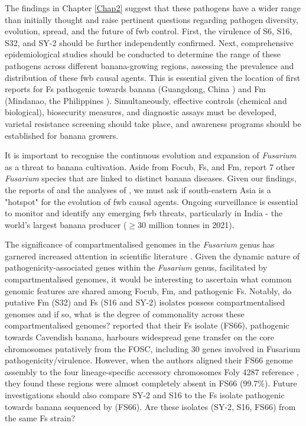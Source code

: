The findings in Chapter \ref{Chap2} suggest that these pathogens have a wider range than initially thought and raise pertinent questions regarding pathogen diversity, evolution, spread, and the future of \ac{fwb} control. First, the virulence of S6, S16, S32, and SY-2 should be further independently confirmed. Next, comprehensive epidemiological studies should be conducted to determine the range of these pathogens across different banana-growing regions, assessing the prevalence and distribution of these \ac{fwb} causal agents. This is essential given the location of first reports for \ac{Fs} pathogenic towards banana (Guangdong, China \parencite{Cui2021}) and \ac{Fm} (Mindanao, the Philippines \parencite{Nozawa2023}). Simultaneously, effective controls (chemical and biological), biosecurity measures, and diagnostic assays must be developed, varietal resistance screening should take place, and awareness programs should be established for banana growers. 

It is important to recognise the continuous evolution and expansion of \textit{Fusarium} as a threat to banana cultivation. Aside from \ac{Focub}, \ac{Fs}, and \ac{Fm}, \textcite{Jones1997, Du2017} report 7 other \textit{Fusarium} species that are linked to distinct banana diseases. Given our findings, the reports of \textcite{Cui2021, Nozawa2023} and the analyses of \textcite{Maryani2019}, we must ask if south-eastern Asia is a "hotspot" for the evolution of \ac{fwb} causal agents. Ongoing surveillance is essential to monitor and identify any emerging \ac{fwb} threats, particularly in India - the world's largest banana producer ($\ge30$ million tonnes in 2021).

The significance of compartmentalised genomes in the \textit{Fusarium} genus has garnered increased attention in scientific literature \parencite{Ma2010, Ma2013, Sperschneider2015b, Frantzeskakis2019, Hoh2022, Kamble2024}. Given the dynamic nature of pathogenicity-associated genes within the \textit{Fusarium} genus, facilitated by compartmentalised genomes, it would be interesting to ascertain what common genomic features are shared among \ac{Focub}, \ac{Fm}, and pathogenic \ac{Fs}. Notably, do putative \ac{Fm} (S32) and \ac{Fs} (S16 and SY-2) isolates possess compartmentalised genomes and if so, what is the degree of commonality across these compartmentalised genomes? \textcite{Cui2021} reported that their \ac{Fs} isolate (FS66), pathogenic towards Cavendish banana, harbours widespread gene transfer on the core chromosomes putatively from the \acl{FOSC}, including 30 genes involved in Fusarium pathogenicity/virulence. However, when the authors aligned their FS66 genome assembly to the four lineage-specific accessory chromosomes \ac{Foly} 4287 reference \parencite{Ma2010}, they found these regions were almost completely absent in FS66 (99.7\%). Future investigations should also compare SY-2 and S16 to the \ac{Fs} isolate pathogenic towards banana sequenced by \textcite{Cui2021} (FS66). Are these isolates (SY-2, S16, FS66) from the same \ac{Fs} strain?

